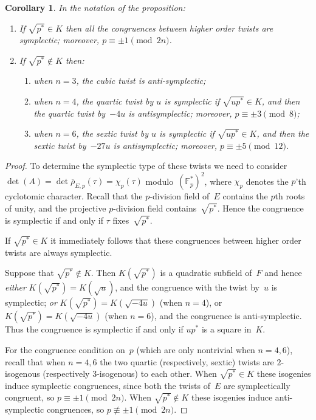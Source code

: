\documentclass[12pt, reqno]{amsart}
\newcommand{\F}{\mathbb{F}}
\newcommand{\rhobar}{{\overline{\rho}}}
\numberwithin{equation}{section}
\newtheorem{corollary}[theorem]{Corollary}
\theoremstyle{definition}
\theoremstyle{remark}
\begin{document}
\begin{corollary}
In the notation of the proposition:
\begin{enumerate}
\item If $\sqrt{p^*}\in K$ then all the congruences between higher
  order twists are symplectic; moreover, $p\equiv\pm1\pmod{2n}$.
\item If $\sqrt{p^*}\notin K$ then:
\begin{enumerate}
\item when $n=3$, the cubic twist is anti-symplectic;
\item when $n=4$, the quartic twist by $u$ is symplectic if
  $\sqrt{up^*}\in K$, and then the quartic twist by~$-4u$ is
  antisymplectic; moreover, $p\equiv\pm3\pmod8$;
\item when $n=6$, the sextic twist by $u$ is symplectic if
  $\sqrt{up^*}\in K$, and then the sextic twist by~$-27u$ is
  antisymplectic; moreover, $p\equiv\pm5\pmod{12}$.
\end{enumerate}
\end{enumerate}
\end{corollary}

\begin{proof}
To determine the symplectic type of these twists we need to consider
$\det(A)=\det\rhobar_{E,p}(\tau)=\chi_p(\tau)$ modulo~$(\F_p^*)^2$,
where $\chi_p$ denotes the $p$'th cyclotomic character.  Recall that
the $p$-division field of~$E$ contains the $p$th roots of unity, and
the projective $p$-division field contains~$\sqrt{p^*}$.  Hence the
congruence is symplectic if and only if $\tau$ fixes~$\sqrt{p^*}$.

If $\sqrt{p^*}\in K$ it immediately follows that these congruences
between higher order twists are always symplectic.

Suppose that $\sqrt{p^*}\notin K$.  Then $K(\sqrt{p^*})$ is a
quadratic subfield of~$F$ and hence \emph{either}
$K(\sqrt{p^*})=K(\sqrt{u})$, and the congruence with the twist by~$u$
is symplectic; \emph{or} $K(\sqrt{p^*})=K(\sqrt{-4u})$ (when $n=4$),
or $K(\sqrt{p^*})=K(\sqrt{-4u})$ (when $n=6$), and the congruence is
anti-symplectic.  Thus the congruence is symplectic if and only if
$up^*$ is a square in~$K$.

For the congruence condition on~$p$ (which are only nontrivial when
$n=4,6$), recall that when $n=4,6$ the two quartic (respectively,
sextic) twists are $2$-isogenous (respectively $3$-isogenous) to each
other.  When $\sqrt{p^*}\in K$ these isogenies induce symplectic
congruences, since both the twists of~$E$ are symplectically
congruent, so $p\equiv\pm1\pmod{2n}$.  When $\sqrt{p^*}\notin K$ these
isogenies induce anti-symplectic congruences, so
$p\not\equiv\pm1\pmod{2n}$.
\end{proof}
\end{document}
